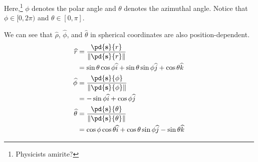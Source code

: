 \documentclass[10pt]{mypackage}
\begin{document}
Here,\footnote{Physicists amirite?} $\phi$ denotes the polar angle and $\theta$ denotes the azimuthal angle. Notice that $\phi \in [0,2\pi)$ and $\theta \in [0,\pi]$.\newline

We can see that $\widehat\rho$, $\widehat\phi$, and $\widehat\theta$ in spherical coordinates are also position-dependent.
\begin{align*}
  \widehat r &= \frac{\pd{\mathbf{s}}{r}}{\norm{\pd{\mathbf{s}}{r}}}\\
         &= \sin\theta\cos\phi\widehat{i} + \sin\theta\sin\phi\widehat{j} + \cos\theta\widehat{k}\\
  \widehat{\phi} &= \frac{\pd{\mathbf{s}}{\phi}}{\norm{\pd{\mathbf{s}}{\phi}}}\\
             &= -\sin\phi\widehat{i} + \cos\phi\widehat{j}\\
  \widehat{\theta} &= \frac{\pd{\mathbf{s}}{\theta}}{\norm{\pd{\mathbf{s}}{\theta}}}\\
               &= \cos\phi\cos\theta\widehat{i} + \cos\theta\sin\phi\widehat{j} - \sin\theta\widehat{k}
\end{align*}
\end{document}

